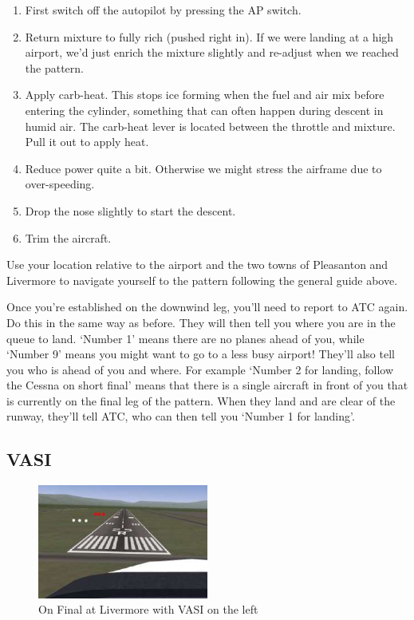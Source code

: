\begin{enumerate}
\item First switch off the autopilot by pressing the AP switch. 

\item Return mixture to fully rich (pushed right in). If we were landing at a high airport, we'd just enrich the mixture slightly and re-adjust when we reached the pattern.

\item Apply carb-heat. This stops ice forming when the fuel and air mix before entering the cylinder, something that can often happen during descent in humid air. The carb-heat lever is located between the throttle and mixture. Pull it out to apply heat.

\item Reduce power quite a bit. Otherwise we might stress the airframe due to over-speeding.

\item Drop the nose slightly to start the descent.

\item Trim the aircraft.

\end{enumerate}

Use your location relative to the airport and the two towns of Pleasanton and Livermore to navigate yourself to the pattern following the general guide above. 

Once you're established on the downwind leg, you'll need to report to ATC again. Do this in the same way as before. They will then tell you where you are in the queue to land. `Number 1' means there are no planes ahead of you, while `Number 9' means you might want to go to a less busy airport! They'll also tell you who is ahead of you and where. For example `Number 2 for landing, follow the Cessna on short final' means that there is a single aircraft in front of you that is currently on the final leg of the pattern. When they land and are
clear of the runway, they'll tell ATC, who can then tell you `Number 1 for landing'.

\subsection{VASI}

\begin{figure}[!htp]
\centering
\includegraphics[width=0.5\textwidth]{vasi2}
\caption{On Final at Livermore with VASI on the left\label{vasi}}
\end{figure}

